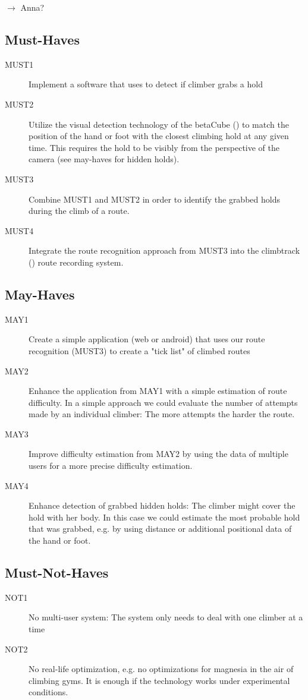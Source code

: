 $\rightarrow$ Anna?

\subsection{Must-Haves}
\begin{description}
	\item[MUST1] Implement a software that uses  to detect if climber grabs a hold
	\item[MUST2] Utilize the visual detection technology of the betaCube () to match the position of the hand or foot with the closest climbing hold at any given time. This requires the hold to be visibly from the perspective of the camera (see may-haves for hidden holds).
	\item[MUST3] Combine MUST1 and MUST2 in order to identify the grabbed holds during the climb of a route.
	\item[MUST4] Integrate the route recognition approach from MUST3 into the climbtrack () route recording system.
\end{description}
\subsection{May-Haves}
\begin{description}
	\item[MAY1] Create a simple application (web or android) that uses our route recognition (MUST3) to create a "tick list" of climbed routes
	\item[MAY2] Enhance the application from MAY1 with a simple estimation of route difficulty. In a simple approach we could evaluate the number of attempts made by an individual climber: The more attempts the harder the route.
	\item[MAY3] Improve difficulty estimation from MAY2 by using the data of multiple users for a more precise difficulty estimation.
	\item[MAY4] Enhance detection of grabbed hidden holds: The climber might cover the hold with her body. In this case we could estimate the most probable hold that was grabbed, e.g. by using distance or additional positional data of the hand or foot.
\end{description}
\subsection{Must-Not-Haves}
\begin{description}
	\item[NOT1] No multi-user system: The system only needs to deal with one climber at a time
	\item[NOT2] No real-life optimization, e.g. no optimizations for magnesia in the air of climbing gyms. It is enough if the technology works under experimental conditions.
\end{description}